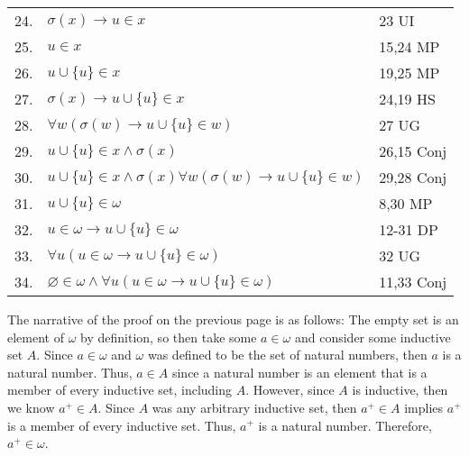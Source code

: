 \documentclass[12pt, a4paper]{article}
\begin{document}
\begin{table}[h!]
\begin{center}
\begin{tabular}{l l l}
        24.& \hspace{10mm}$\sigma(x)\rightarrow u\in x$ & 23 UI\\
        
        25.& \hspace{10mm}$u\in x$ & 15,24 MP\\
        
        26.& \hspace{10mm}$u\cup\{u\}\in x$ & 19,25 MP\\
        
        27.& \hspace{10mm}$\sigma(x)\rightarrow u\cup\{u\}\in x$ & 24,19 HS\\
        
        28.& \hspace{10mm}$\forall w(\sigma(w)\rightarrow u\cup\{u\}\in w)$ & 27 UG\\
        
        29.& \hspace{10mm}$u\cup\{u\}\in x\wedge\sigma(x)$ & 26,15 Conj\\
        
        30.& \hspace{10mm}$u\cup\{u\}\in x\wedge\sigma(x)\forall w(\sigma(w)\rightarrow u\cup\{u\}\in w)$ & 29,28          Conj\\
        31.& \hspace{10mm}$u\cup\{u\}\in\omega$ & 8,30 MP\\
        
        32.& $u\in\omega\rightarrow u\cup\{u\}\in\omega$ & 12-31 DP\\
        
        33.& $\forall u(u\in\omega\rightarrow u\cup\{u\}\in\omega)$ & 32 UG\\
        
        34.& $\varnothing\in\omega\wedge\forall u(u\in\omega\rightarrow u\cup\{u\}\in\omega)$ & 11,33 Conj\\
        
        \hline
        \end{tabular}
    \end{center}
\end{table}

\restoregeometry

\newpage

\noindent The narrative of the proof on the previous page is as follows: The empty set is an element of $\omega$ by definition, so then take some $a\in\omega$ and consider some inductive set $A$. Since $a\in\omega$ and $\omega$ was defined to be the set of natural numbers, then $a$ is a natural number. Thus, $a\in A$ since a natural number is an element that is a member of every inductive set, including $A$. However, since $A$ is inductive, then we know $a^+\in A$. Since $A$ was any arbitrary inductive set, then $a^+\in A$ implies $a^+$ is a member of every inductive set. Thus, $a^+$ is a natural number. Therefore, $a^+\in\omega$.
\end{document}
